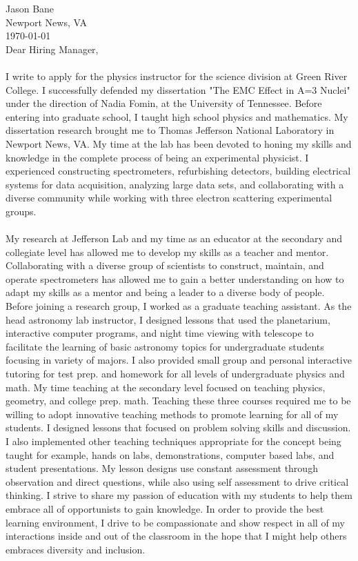 \documentclass[12pt,letterpaper]{article}
\begin{document}
\vspace*{-1.2cm}
\noindent Jason Bane\\
Newport News, VA \\
\today\\

Dear Hiring Manager,

\paragraph{}I write to apply for the physics instructor for the science division at Green River College. I successfully defended my dissertation "The EMC Effect in A=3 Nuclei" under the direction of Nadia Fomin, at the University of Tennessee. Before entering into graduate school, I taught high school physics and mathematics. My dissertation research brought me to Thomas Jefferson National Laboratory in Newport News, VA. My time at the lab has been devoted to honing my skills and knowledge in the complete process of being an experimental physicist. I experienced constructing spectrometers, refurbishing detectors, building electrical systems for data acquisition, analyzing large data sets, and collaborating with a diverse community while working with three electron scattering experimental groups.
\paragraph{}My research at Jefferson Lab and my time as an educator at the secondary and collegiate level has allowed me to develop my skills as a teacher and mentor. Collaborating with a diverse group of scientists to construct, maintain, and operate spectrometers has allowed me to gain a better understanding on how to adapt my skills as a mentor and being a leader to a diverse body of people. Before joining a research group, I worked as a graduate teaching assistant. As the head astronomy lab instructor, I designed lessons that used the planetarium, interactive computer programs, and night time viewing with telescope to facilitate the learning of basic astronomy topics for undergraduate students focusing in variety of majors. I also provided small group and personal interactive tutoring for test prep. and homework for all levels of undergraduate physics and math. My time teaching at the secondary level focused on teaching physics, geometry, and  college prep. math. Teaching these three courses required me to be willing to adopt innovative teaching methods to promote learning for all of my students. I designed lessons that focused on problem solving skills and discussion. I also implemented other teaching techniques appropriate for the concept being taught for example, hands on labs, demonstrations, computer based labs, and student presentations. My lesson designs use constant assessment through observation and direct questions, while also using self assessment to drive critical thinking. I strive to share my passion of education with my students to help them embrace all of opportunists to gain knowledge. In order to provide the best learning environment, I drive to be compassionate and show respect in all of my interactions inside and out of the classroom in the hope that I might help others embraces diversity and inclusion. 
\end{document}
